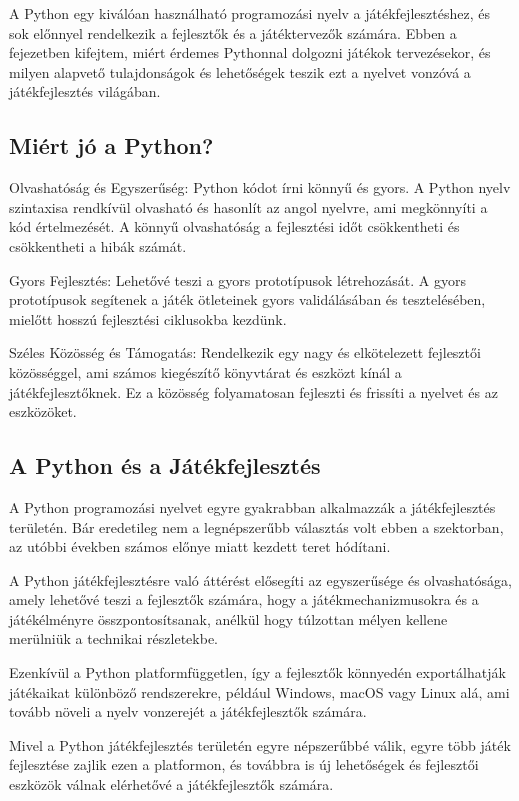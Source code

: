 \indent \indent A Python egy kiválóan használható programozási nyelv a játékfejlesztéshez, és sok előnnyel rendelkezik a fejlesztők és a játéktervezők számára. Ebben a fejezetben kifejtem, miért érdemes Pythonnal dolgozni játékok tervezésekor, és milyen alapvető tulajdonságok és lehetőségek teszik ezt a nyelvet vonzóvá a játékfejlesztés világában.

\subsection{Miért jó a Python?}
\indent \indent Olvashatóság és Egyszerűség:
Python kódot írni könnyű és gyors. A Python nyelv szintaxisa rendkívül olvasható és hasonlít az angol nyelvre, ami megkönnyíti a kód értelmezését. A könnyű olvashatóság a fejlesztési időt csökkentheti és csökkentheti a hibák számát.

Gyors Fejlesztés:
Lehetővé teszi a gyors prototípusok létrehozását. A gyors prototípusok segítenek a játék ötleteinek gyors validálásában és tesztelésében, mielőtt hosszú fejlesztési ciklusokba kezdünk.

Széles Közösség és Támogatás:
Rendelkezik egy nagy és elkötelezett fejlesztői közösséggel, ami számos kiegészítő könyvtárat és eszközt kínál a játékfejlesztőknek. Ez a közösség folyamatosan fejleszti és frissíti a nyelvet és az eszközöket. \cite{why-is-python}


\subsection{A Python és a Játékfejlesztés}\cite{python-in-game-dev}
\indent \indent A Python programozási nyelvet egyre gyakrabban alkalmazzák a játékfejlesztés területén. Bár eredetileg nem a legnépszerűbb választás volt ebben a szektorban, az utóbbi években számos előnye miatt kezdett teret hódítani.

A Python játékfejlesztésre való áttérést elősegíti az egyszerűsége és olvashatósága, amely lehetővé teszi a fejlesztők számára, hogy a játékmechanizmusokra és a játékélményre összpontosítsanak, anélkül hogy túlzottan mélyen kellene merülniük a technikai részletekbe.

Ezenkívül a Python platformfüggetlen, így a fejlesztők könnyedén exportálhatják játékaikat különböző rendszerekre, például Windows, macOS vagy Linux alá, ami tovább növeli a nyelv vonzerejét a játékfejlesztők számára.

Mivel a Python játékfejlesztés területén egyre népszerűbbé válik, egyre több játék fejlesztése zajlik ezen a platformon, és továbbra is új lehetőségek és fejlesztői eszközök válnak elérhetővé a játékfejlesztők számára.

